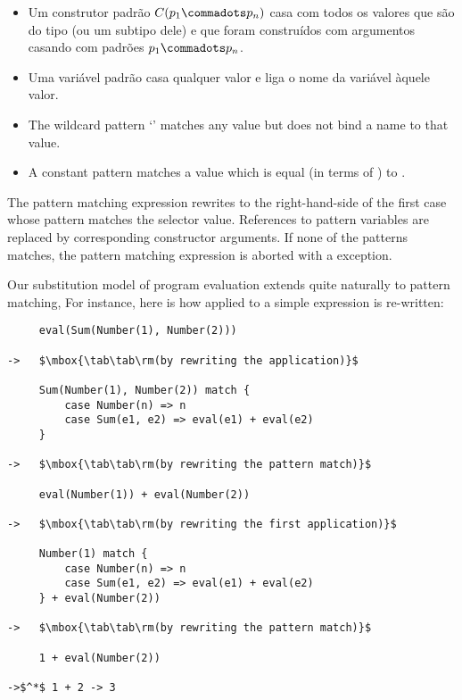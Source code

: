 \begin{itemize}
\item
Um construtor padrão $C(p_1 \commadots p_n)$ casa com todos os valores que são 
do tipo  (ou um subtipo dele) e que foram construídos com argumentos 
casando com padrões $p_1 \commadots p_n$.


\item 
Uma variável padrão  casa qualquer valor e liga o nome da variável àquele valor.


\item 
The wildcard pattern `\code{_}' matches any value but does not bind a name to that value. 
\item A constant pattern  matches a value which is
equal (in terms of \code{==}) to .
\end{itemize}
The pattern matching expression rewrites to the right-hand-side of the
first case whose pattern matches the selector value. References to
pattern variables are replaced by corresponding constructor arguments.
If none of the patterns matches, the pattern matching expression is
aborted with a  exception.

\example Our substitution model of program evaluation extends quite naturally to pattern matching, For instance, here is how  applied to a simple expression is re-written:
\begin{lstlisting}
     eval(Sum(Number(1), Number(2)))

->   $\mbox{\tab\tab\rm(by rewriting the application)}$

     Sum(Number(1), Number(2)) match {
         case Number(n) => n
         case Sum(e1, e2) => eval(e1) + eval(e2)
     }

->   $\mbox{\tab\tab\rm(by rewriting the pattern match)}$

     eval(Number(1)) + eval(Number(2))

->   $\mbox{\tab\tab\rm(by rewriting the first application)}$

     Number(1) match {
         case Number(n) => n
         case Sum(e1, e2) => eval(e1) + eval(e2)
     } + eval(Number(2))

->   $\mbox{\tab\tab\rm(by rewriting the pattern match)}$

     1 + eval(Number(2))

->$^*$ 1 + 2 -> 3
\end{lstlisting}

